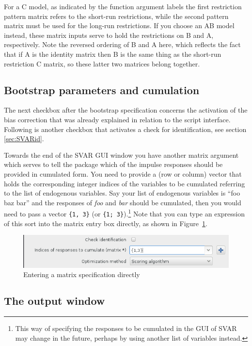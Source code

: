 \documentclass[a4paper,10pt]{article}
\newcounter{script}[section]
\begin{document}
For a C model, as indicated by the function argument labels the first
restriction pattern matrix refers to the short-run restrictions, while
the second pattern matrix must be used for the long-run
restrictions. If you choose an AB model instead, these matrix inputs
serve to hold the restrictions on B and A, respectively. Note the
reversed ordering of B and A here, which reflects the fact that if A
is the identity matrix then B is the same thing as the short-run
restriction C matrix, so these latter two matrices belong together.

\subsection{Bootstrap parameters and cumulation}

The next checkbox after the bootstrap specification concerns the
activation of the bias correction that was already explained in
relation to the script interface. Following is another checkbox that
activates a check for identification, see section \ref{sec:SVARid}.

Towards the end of the SVAR GUI window you have another matrix
argument which serves to tell the package which of the impulse
responses should be provided in cumulated form. You need to provide a
(row or column) vector that holds the corresponding integer indices of
the variables to be cumulated referring to the list of endogenous
variables. Say your list of endogenous variables is ``foo baz bar''
and the responses of \emph{foo} and \emph{bar} should be cumulated,
then you would need to pass a vector \texttt{\{1, 3\}} (or
\texttt{\{1; 3\}}).\footnote{This way of specifying the responses to
  be cumulated in the GUI of SVAR may change in the future, perhaps by
  using another list of variables instead.} Note that you can type an
expression of this sort into the matrix entry box directly, as shown in
Figure~\ref{fig:matrix-entry}.

\begin{figure}[htbp]
  \centering
  \includegraphics[scale=0.5]{dialog_mat.png}
  \caption{Entering a matrix specification directly}
  \label{fig:matrix-entry}
\end{figure}

\subsection{The output window}
\end{document}
